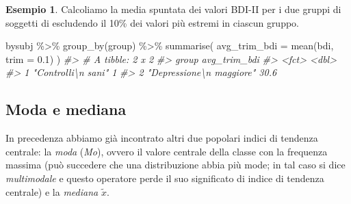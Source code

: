\documentclass[
  10pt,
  italian,
  a4paper,
  extrafontsizes,onecolumn,openright
  ]{memoir}
\newenvironment{Shaded}{\begin{snugshade}}{\end{snugshade}}
\newcommand{\AttributeTok}[1]{\textcolor[rgb]{0.77,0.63,0.00}{#1}}
\newcommand{\CommentTok}[1]{\textcolor[rgb]{0.56,0.35,0.01}{\textit{#1}}}
\newcommand{\FloatTok}[1]{\textcolor[rgb]{0.00,0.00,0.81}{#1}}
\newcommand{\FunctionTok}[1]{\textcolor[rgb]{0.00,0.00,0.00}{#1}}
\newcommand{\NormalTok}[1]{#1}
\newcommand{\SpecialCharTok}[1]{\textcolor[rgb]{0.00,0.00,0.00}{#1}}
\theoremstyle{definition}
\theoremstyle{definition}
\newtheorem{example}{Esempio}[chapter]
\theoremstyle{definition}
\theoremstyle{definition}
\theoremstyle{remark}
\begin{document}
\begin{example}

Calcoliamo la media spuntata dei valori BDI-II per i due gruppi di soggetti di \textcite{zetschefuture2019} escludendo il 10\% dei valori più estremi in ciascun gruppo.

\begin{Shaded}
\begin{Highlighting}[]
\NormalTok{bysubj }\SpecialCharTok{\%\textgreater{}\%}
  \FunctionTok{group\_by}\NormalTok{(group) }\SpecialCharTok{\%\textgreater{}\%}
  \FunctionTok{summarise}\NormalTok{(}
    \AttributeTok{avg\_trim\_bdi =} \FunctionTok{mean}\NormalTok{(bdi, }\AttributeTok{trim =} \FloatTok{0.1}\NormalTok{)}
\NormalTok{  )}
\CommentTok{\#\textgreater{} \# A tibble: 2 x 2}
\CommentTok{\#\textgreater{}   group                    avg\_trim\_bdi}
\CommentTok{\#\textgreater{}   \textless{}fct\textgreater{}                           \textless{}dbl\textgreater{}}
\CommentTok{\#\textgreater{} 1 "Controlli\textbackslash{}n sani"                1  }
\CommentTok{\#\textgreater{} 2 "Depressione\textbackslash{}n maggiore"         30.6}
\end{Highlighting}
\end{Shaded}

\end{example}

\hypertarget{moda-e-mediana}{%
\subsection{Moda e mediana}\label{moda-e-mediana}}

In precedenza abbiamo già incontrato altri due popolari indici di
tendenza centrale: la \emph{moda} (\emph{Mo}), ovvero il valore centrale della
classe con la frequenza massima (può succedere che una distribuzione
abbia più mode; in tal caso si dice \emph{multimodale} e questo operatore
perde il suo significato di indice di tendenza centrale) e la \emph{mediana}
\(\tilde{x}\).
\end{document}

